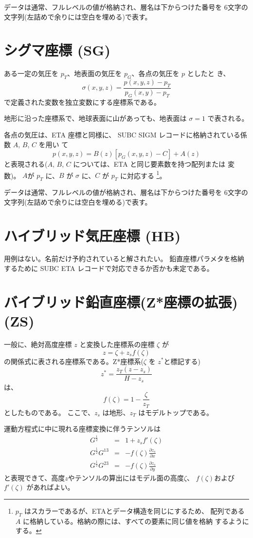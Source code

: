 データは通常、フルレベルの値が格納され、層名は下からつけた番号を
6文字の文字列(左詰めで余りには空白を埋める)で表す。

\section{シグマ座標 (SG)}
ある一定の気圧を $p_T$、地表面の気圧を $p_G$、各点の気圧を $p$ としたと
き、
\[
 \sigma(x, y, z) = \frac{p(x, y, z) - p_T}{p_G(x, y) - p_T}
\]
で定義された変数を独立変数にする座標系である。

地形に沿った座標系で、地球表面に山があっても、地表面は
$\sigma = 1$ で表される。

各点の気圧は、ETA 座標と同様に、
SUBC SIGM レコードに格納されている係数 $A$, $B$, $C$ を用い
て
\[
 p(x, y, z) = B(z)[p_G(x, y, z) - C] + A(z)
\]
と表現される($A$, $B$, $C$ については、ETA と同じ要素数を持つ配列または
変数)。
$A$が $p_T$ に、$B$ が $\sigma$ に、$C$ が $p_T$ に対応する
\footnote{$p_T$ はスカラーであるが、ETAとデータ構造を同じにするため、
配列である $A$ に格納している。格納の際には、すべての要素に同じ値を格納
するようにする。}。


データは通常、フルレベルの値が格納され、層名は下からつけた番号を
6文字の文字列(左詰めで余りには空白を埋める)で表す。

\section{ハイブリッド気圧座標 (HB)}

用例はない。名前だけ予約されていると解されたい。
鉛直座標パラメタを格納するために
SUBC ETA レコードで対応できるか否かも未定である。

\section{バイブリッド鉛直座標(Z*座標の拡張)(ZS)}
一般に、絶対高度座標 $z$ と変換した座標系の座標 $\zeta$ が
\[
 z = \zeta + z_s f(\zeta)
\]
の関係式に表される座標系である。Z*座標系($\zeta$ を $z^*$と標記する)
\[
 z^* = \frac{z_T(z-z_s)}{H-z_s}
\]
は、
\[
 f(\zeta) = 1-\frac{\zeta}{z_T}
\]
としたものである。
ここで、$z_s$ は地形、$z_T$ はモデルトップである。

運動方程式に中に現れる座標変換に伴うテンソルは
\begin{eqnarray*}
 G^{\frac12} &=& 1 + z_s f'(\zeta) \\
 G^{\frac12}G^{13} &=& -f(\zeta)\frac{\partial z_s}{\partial x} \\
 G^{\frac12}G^{23} &=& -f(\zeta)\frac{\partial z_s}{\partial y}
\end{eqnarray*}
と表現できて、高度$z$やテンソルの算出にはモデル面の高度$\zeta$、
$f(\zeta)$および$f'(\zeta)$ があればよい。

